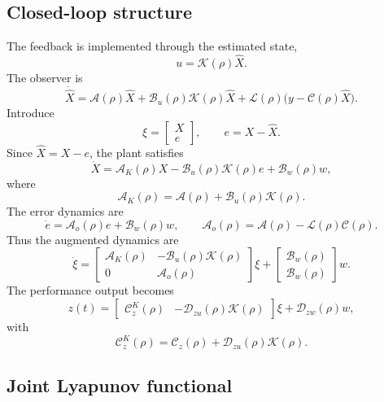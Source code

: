 \documentclass[AMA,Times2COL]{WileyNJDv5}
\begin{document}
\subsection{Closed-loop structure}

The feedback is implemented through the estimated state,
\[
u=\mathcal{K}(\rho)\hat X .
\]
The observer is
\[
\dot{\hat X}
=
\mathcal{A}(\rho)\hat X
+
\mathcal{B}_u(\rho)\mathcal{K}(\rho)\hat X
+
\mathcal{L}(\rho)\big(y-\mathcal{C}(\rho)\hat X\big).
\]
Introduce
\[
\xi =
\begin{bmatrix}
X\\ e
\end{bmatrix},
\qquad
e=X-\hat X .
\]
Since $\hat X=X-e$, the plant satisfies
\[
\dot X
=
\mathcal A_K(\rho)X
-
\mathcal B_u(\rho)\mathcal K(\rho)e
+
\mathcal B_w(\rho)w ,
\]
where
\[
\mathcal{A}_K(\rho)
=
\mathcal{A}(\rho)+\mathcal{B}_u(\rho)\mathcal{K}(\rho).
\]
The error dynamics are
\[
\dot e
=
\mathcal A_o(\rho)e+\mathcal B_w(\rho)w,
\qquad
\mathcal A_o(\rho)
=
\mathcal A(\rho)-\mathcal L(\rho)\mathcal C(\rho).
\]
Thus the augmented dynamics are
\begin{equation}\label{eq:joint-extended-system}
\dot{\xi}
=
\begin{bmatrix}
\mathcal{A}_K(\rho) & -\mathcal{B}_u(\rho)\mathcal{K}(\rho)\\[0.15em]
0 & \mathcal{A}_o(\rho)
\end{bmatrix}\xi
+
\begin{bmatrix}
\mathcal{B}_w(\rho)\\
\mathcal{B}_w(\rho)
\end{bmatrix}w .
\end{equation}
The performance output becomes
\[
z(t)
=
\begin{bmatrix}
\mathcal C_z^K(\rho) & -\mathcal D_{zu}(\rho)\mathcal K(\rho)
\end{bmatrix}\xi
+
\mathcal D_{zw}(\rho)w ,
\]
with
\[
\mathcal C_z^K(\rho)
=
\mathcal C_z(\rho)+\mathcal D_{zu}(\rho)\mathcal K(\rho).
\]

\subsection{Joint Lyapunov functional}
\end{document}
